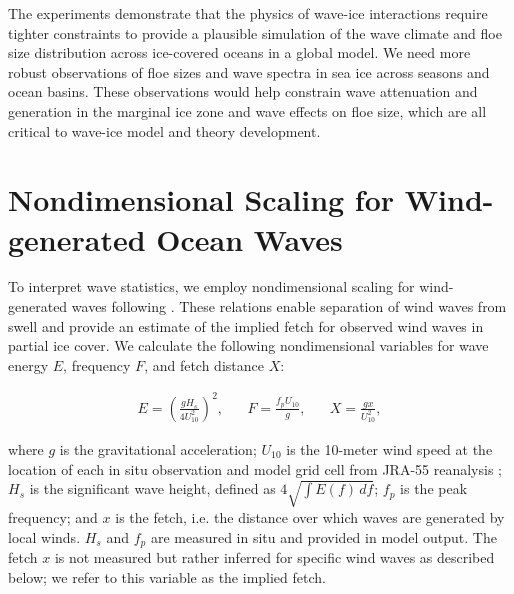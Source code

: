 \documentclass [11pt, proquest] {uwthesis}[2020/02/24]
\begin{document}
The experiments demonstrate that the physics of wave-ice interactions require tighter constraints to provide a plausible simulation of the wave climate and floe size distribution across ice-covered oceans in a global model. We need more robust observations of floe sizes and wave spectra in sea ice across seasons and ocean basins. These observations would help constrain wave attenuation and generation in the marginal ice zone and wave effects on floe size, which are all critical to wave-ice model and theory development.  

\printendnotes

%

%
\appendix
\raggedbottom\sloppy
 
\chapter{Nondimensional Scaling for Wind-generated Ocean Waves} \label{scaling-method}

To interpret wave statistics, we employ nondimensional scaling for wind-generated waves following \cite{Young1999}. These relations enable separation of wind waves from swell and provide an estimate of the implied fetch for observed wind waves in partial ice cover. We calculate the following nondimensional variables for wave energy \(E\), frequency \(F\), and fetch distance \(X\):


\begin{align}\label{eq:nondim}
E = \left(\frac{g H_s}{4 U^2_{10}} \right)^2, \hspace{20pt} 
F = \frac{f_p U_{10}}{g}, \hspace{20pt}  
X = \frac{g x}{U^2_{10}},
\end{align}

\noindent where \(g\) is the gravitational acceleration; \(U_{10}\) is the 10-meter wind speed at the location of each in situ observation and model grid cell from JRA-55 reanalysis \cite{KOBAYASHI2015TheCharacteristics, cisl_rda_ds628.0}; \(H_s\) is the significant wave height, defined as $4 \sqrt{ \int E(f)\,df}$; \(f_p\) is the peak frequency; and \(x\) is the fetch, i.e. the distance over which waves are generated by local winds. \(H_s\) and \(f_p\) are measured in situ and provided in model output. The fetch \(x\) is not measured but rather inferred for specific wind waves as described below; we refer to this variable as the implied fetch.  
\end{document}
